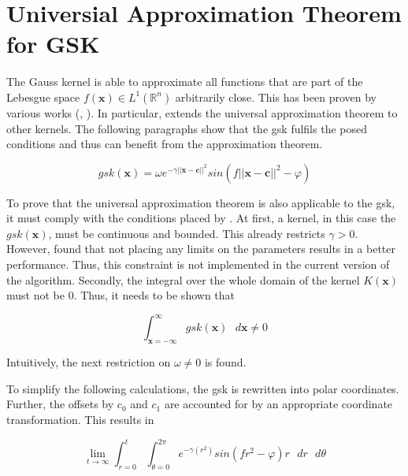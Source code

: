 \documentclass[./\jobname.tex]{subfiles}
\begin{document}
	
\section{Universial Approximation Theorem for GSK}
\label{chap:gsin_approximation_theorem}

The Gauss kernel is able to approximate all functions that are part of the Lebesgue space $f(\mathbf{x}) \in L^1(\mathbb{R}^n)$ arbitrarily close. This has been proven by various works (\cite{park_universal_1991}, \cite{hangelbroek_nonlinear_2010}). In particular, \cite{park_universal_1991} extends the universal approximation theorem to other kernels. The following paragraphs show that the \gls{gsk} fulfils the posed conditions and thus can benefit from the approximation theorem.  

\begin{equation}
\label{eq:gsin_kernel_theoretical_notes}
gsk(\mathbf{x}) = \omega e^{-\gamma ||\mathbf{x} - \mathbf{c}||^2} sin(f ||\mathbf{x} - \mathbf{c}||^2 - \varphi)
\end{equation}

To prove that the universal approximation theorem is also applicable to the \gls{gsk}, it must comply with the conditions placed by \cite{park_universal_1991}. At first, a kernel, in this case the $gsk(\mathbf{x})$, must be continuous and bounded. This already restricts $\gamma > 0$. However, \cite{chaquet_using_2019} found that not placing any limits on the parameters results in a better performance. Thus, this constraint is not implemented in the current version of the algorithm. Secondly, the integral over the whole domain of the kernel $K(\mathbf{x})$ must not be $0$. Thus, it needs to be shown that 

\begin{equation}
\int_{\mathbf{x} = -\mathbf{\infty}}^{\infty} gsk(\mathbf{x}) \text{ } d\mathbf{x} \neq 0
\end{equation} 

Intuitively, the next restriction on $\omega \neq 0$ is found. 

To simplify the following calculations, the \gls{gsk} is rewritten into polar coordinates. Further, the offsets by $c_0$ and $c_1$ are accounted for by an appropriate coordinate transformation. This results in 

\begin{equation}
\lim_{t \to \infty} \int_{r=0}^{t} \int_{\theta = 0}^{2 \pi} e^{-\gamma(r^2)} sin(f r^2 - \varphi) r \text{ } dr \text{ } d\theta
\end{equation}
\end{document}

